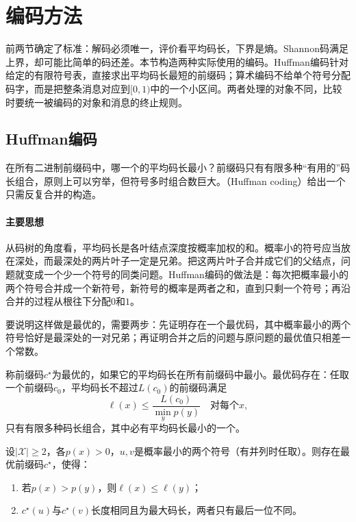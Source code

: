 \section{编码方法}
\label{sec:lossless-methods}

前两节确定了标准：解码必须唯一，评价看平均码长，下界是熵。Shannon码满足上界，却可能比简单的码还差。本节构造两种实际使用的编码。Huffman编码针对给定的有限符号表，直接求出平均码长最短的前缀码；算术编码不给单个符号分配码字，而是把整条消息对应到$[0,1)$中的一个小区间。两者处理的对象不同，比较时要统一被编码的对象和消息的终止规则。

\subsection{Huffman编码}
\label{sec:lossless-huffman}

在所有二进制前缀码中，哪一个的平均码长最小？前缀码只有有限多种“有用的”码长组合，原则上可以穷举，但符号多时组合数巨大。（Huffman coding）给出一个只需反复合并的构造。

\paragraph{主要思想}
从码树的角度看，平均码长是各叶结点深度按概率加权的和。概率小的符号应当放在深处，而最深处的两片叶子一定是兄弟。把这两片叶子合并成它们的父结点，问题就变成一个少一个符号的同类问题。Huffman编码的做法是：每次把概率最小的两个符号合并成一个新符号，新符号的概率是两者之和，直到只剩一个符号；再沿合并的过程从根往下分配$0$和$1$。

要说明这样做是最优的，需要两步：先证明存在一个最优码，其中概率最小的两个符号恰好是最深处的一对兄弟；再证明合并之后的问题与原问题的最优值只相差一个常数。

称前缀码$c^{\star}$为最优的，如果它的平均码长在所有前缀码中最小。最优码存在：任取一个前缀码$c_0$，平均码长不超过$L(c_0)$的前缀码满足
\[
 \ell(x)\leq\frac{L(c_0)}{\min_y p(y)}\quad\text{对每个}x ,
\]
只有有限多种码长组合，其中必有平均码长最小的一个。

\begin{lemma}[最优码的结构]
\label{lem:lossless-optimal-structure}
设$\lvert\mathcal{X}\rvert\geq2$，各$p(x)>0$，$u,v$是概率最小的两个符号（有并列时任取）。则存在最优前缀码$c^{\star}$，使得：
\begin{enumerate}
 \item 若$p(x)>p(y)$，则$\ell(x)\leq\ell(y)$；
 \item $c^{\star}(u)$与$c^{\star}(v)$长度相同且为最大码长，两者只有最后一位不同。
\end{enumerate}
\end{lemma}

